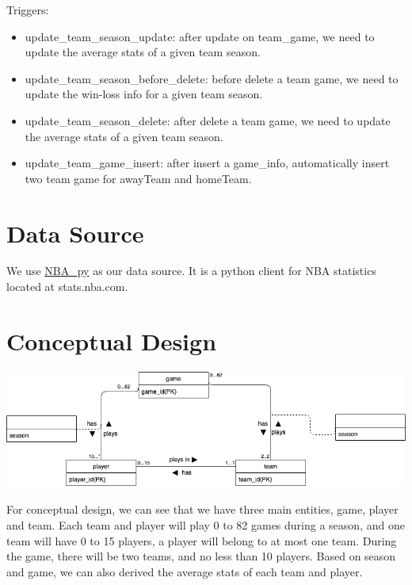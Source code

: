 \documentclass[a4paper,12pt]{article} %
\begin{document}
Triggers:
\begin{itemize}
    \item update\_team\_season\_update: after update on team\_game, we need to update the average stats of a given team season.
    \item update\_team\_season\_before\_delete: before delete a team game, we need to update the win-loss info for a given team season.
    \item update\_team\_season\_delete: after delete a team game, we need to update the average stats of a given team season.
    \item update\_team\_game\_insert: after insert a game\_info, automatically insert two team game for awayTeam and homeTeam.
\end{itemize}

\section{Data Source}
We use \href{https://github.com/seemethere/nba_py}{NBA\_py} as our data source. It is a python client for NBA statistics located 
at stats.nba.com. 

\section{Conceptual Design}
\begin{center}
\includegraphics[width=1\textwidth]{CD}
\end{center}
For conceptual design, we can see that we have three main entities, game, player and team. Each team and player will play 0 to 82 games during a season, and one team will have 0 to 15 players, a player will belong to at most one team. During the game, there will be two teams, and no less than 10 players. Based on season and game, we can also derived the average stats of each team and player.
\end{document}
